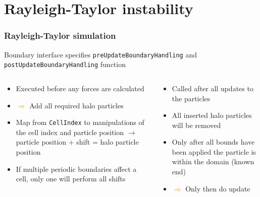 
\section{Rayleigh-Taylor instability}
\label{sec:rayleigh}

\begin{frame}
    \frametitle{Rayleigh-Taylor simulation}

    Boundary interface specifies \texttt{preUpdateBoundaryHandling} and \texttt{postUpdateBoundaryHandling} function

    \vspace{7pt}
    \begin{columns}
        \begin{column}{.5\textwidth}
            \begin{itemize}
                \item Executed before any forces are calculated
                \item[] \!\!\!\!\!\!\!\!\! \textcolor{orange}{$\Rightarrow$} Add all required halo particles
                \item Map from \texttt{CellIndex} to manipulations of the cell index and particle position $\rightarrow$ particle position + shift = halo particle position
                \item If multiple periodic boundaries affect a cell, only one will perform all shifts
            \end{itemize}
        \end{column}

        \begin{column}{.5\textwidth}
            \begin{itemize}
                \item Called after all updates to the particles
                \item All inserted halo particles will be removed
                \item Only after all bounds have been applied the particle is within the domain (known end)
                \item[] \!\!\!\!\!\!\!\!\! \textcolor{orange}{$\Rightarrow$} Only then do update
            \end{itemize}
        \end{column}
    \end{columns}
    \vspace{7pt}


\end{frame}
